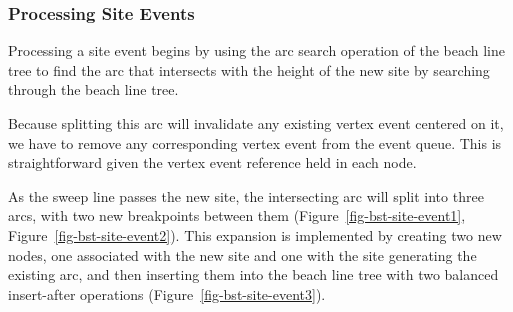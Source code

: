 \documentclass[
  letterpaper,
  DIV=11,
  numbers=noendperiod]{scrartcl}
\begin{document}
\subsubsection{Processing Site Events}\label{processing-site-events}

Processing a site event begins by using the arc search operation of the
beach line tree to find the arc that intersects with the height of the
new site by searching through the beach line tree.

Because splitting this arc will invalidate any existing vertex event
centered on it, we have to remove any corresponding vertex event from
the event queue. This is straightforward given the vertex event
reference held in each node.

As the sweep line passes the new site, the intersecting arc will split
into three arcs, with two new breakpoints between them
(Figure~\ref{fig-bst-site-event1}, Figure~\ref{fig-bst-site-event2}).
This expansion is implemented by creating two new nodes, one associated
with the new site and one with the site generating the existing arc, and
then inserting them into the beach line tree with two balanced
insert-after operations (Figure~\ref{fig-bst-site-event3}).
\end{document}
